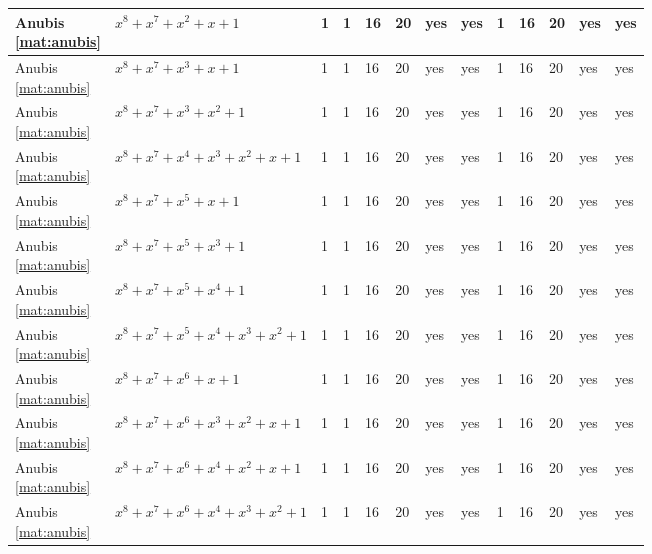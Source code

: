 \begin{tiny}
\begin{longtable}{|l|l|l|l|l|l|l|l|l|l|l|l|l|}
\shortstack{Anubis \\ \eqref{mat:anubis}} & $x^8 + x^7 + x^2 + x + 1$ & 1 & 1 & 16 & 20 & yes & yes & 1 & 16 & 20 & yes & yes \\ \hline
\shortstack{Anubis \\ \eqref{mat:anubis}} & $x^8 + x^7 + x^3 + x + 1$ & 1 & 1 & 16 & 20 & yes & yes & 1 & 16 & 20 & yes & yes \\ \hline
\shortstack{Anubis \\ \eqref{mat:anubis}} & $x^8 + x^7 + x^3 + x^2 + 1$ & 1 & 1 & 16 & 20 & yes & yes & 1 & 16 & 20 & yes & yes \\ \hline
\shortstack{Anubis \\ \eqref{mat:anubis}} & $x^8 + x^7 + x^4 + x^3 + x^2 + x + 1$ & 1 & 1 & 16 & 20 & yes & yes & 1 & 16 & 20 & yes & yes \\ \hline
\shortstack{Anubis \\ \eqref{mat:anubis}} & $x^8 + x^7 + x^5 + x + 1$ & 1 & 1 & 16 & 20 & yes & yes & 1 & 16 & 20 & yes & yes \\ \hline
\shortstack{Anubis \\ \eqref{mat:anubis}} & $x^8 + x^7 + x^5 + x^3 + 1$ & 1 & 1 & 16 & 20 & yes & yes & 1 & 16 & 20 & yes & yes \\ \hline
\shortstack{Anubis \\ \eqref{mat:anubis}} & $x^8 + x^7 + x^5 + x^4 + 1$ & 1 & 1 & 16 & 20 & yes & yes & 1 & 16 & 20 & yes & yes \\ \hline
\shortstack{Anubis \\ \eqref{mat:anubis}} & $x^8 + x^7 + x^5 + x^4 + x^3 + x^2 + 1$ & 1 & 1 & 16 & 20 & yes & yes & 1 & 16 & 20 & yes & yes \\ \hline
\shortstack{Anubis \\ \eqref{mat:anubis}} & $x^8 + x^7 + x^6 + x + 1$ & 1 & 1 & 16 & 20 & yes & yes & 1 & 16 & 20 & yes & yes \\ \hline
\shortstack{Anubis \\ \eqref{mat:anubis}} & $x^8 + x^7 + x^6 + x^3 + x^2 + x + 1$ & 1 & 1 & 16 & 20 & yes & yes & 1 & 16 & 20 & yes & yes \\ \hline
\shortstack{Anubis \\ \eqref{mat:anubis}} & $x^8 + x^7 + x^6 + x^4 + x^2 + x + 1$ & 1 & 1 & 16 & 20 & yes & yes & 1 & 16 & 20 & yes & yes \\ \hline
\shortstack{Anubis \\ \eqref{mat:anubis}} & $x^8 + x^7 + x^6 + x^4 + x^3 + x^2 + 1$ & 1 & 1 & 16 & 20 & yes & yes & 1 & 16 & 20 & yes & yes \\ \hline

\end{longtable}
\end{tiny}
